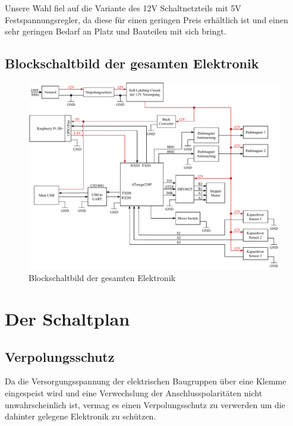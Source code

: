 Unsere Wahl fiel auf die Variante des 12V Schaltnetzteils mit 5V Festspannungsregler, da diese für einen geringen Preis erhältlich ist
und einen sehr geringen Bedarf an Platz und Bauteilen mit sich bringt.



\subsection{Blockschaltbild der gesamten Elektronik}

\begin{figure}[hb]
    \centering
    \includegraphics[scale=0.85,page=1]{fig/elektro/ElectroBlockDiagram.pdf}
    \caption{Blockschaltbild der gesamten Elektronik}
\end{figure}

\newpage


\section{Der Schaltplan}

\subsection{Verpolungsschutz}

Da die Versorgungsspannung der elektrischen Baugruppen über eine Klemme eingespeist wird und eine Verwechslung
der Anschlusspolaritäten nicht unwahrscheinlich ist, vermag es einen Verpolungsschutz zu verwerden um die
dahinter gelegene Elektronik zu schützen.

